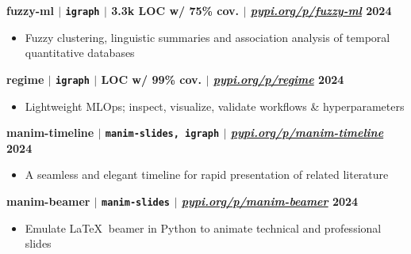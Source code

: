 \documentclass[11pt]{article} %
\begin{document}
\vspace{-4pt}

\noindent\textbf{fuzzy-ml\textsuperscript{\dag} $|$ \texttt{igraph} $|$ {\normalfont3.3k LOC w/ 75\% cov.} $|$ \href{https://pypi.org/p/fuzzy-ml}
{\normalfont\textit{pypi.org/p/fuzzy-ml}} \hfill 2024}
\vspace{-6pt}
\begin{itemize}
\setlength\itemsep{-0.5em}
  \item Fuzzy clustering, linguistic summaries and association analysis of temporal quantitative databases
\end{itemize}

\vspace{-4pt}

\noindent\textbf{regime\textsuperscript{\dag} $|$ \texttt{igraph} $|$ { LOC w/ 99\% cov.} $|$ \href{https://pypi.org/p/regime}
{\normalfont\textit{pypi.org/p/regime}} \hfill 2024}
\vspace{-6pt}
\begin{itemize}
\setlength\itemsep{-0.5em}
  \item Lightweight MLOps; inspect, visualize, validate workflows \& hyperparameters
\end{itemize}

\vspace{-4pt}

\noindent\textbf{manim-timeline\textsuperscript{\dag} $|$ \texttt{manim-slides, igraph} $|$ \href{https://pypi.org/p/manim-timeline}
{\normalfont\textit{pypi.org/p/manim-timeline}} \hfill 2024}
\vspace{-6pt}
\begin{itemize}
\setlength\itemsep{-0.5em}
  \item A seamless and elegant timeline for rapid presentation of related literature
\end{itemize}

\vspace{-4pt}

\noindent\textbf{manim-beamer\textsuperscript{\dag} $|$ \texttt{manim-slides} $|$ \href{https://pypi.org/p/manim-beamer}
{\normalfont\textit{pypi.org/p/manim-beamer}} \hfill 2024}
\vspace{-6pt}
\begin{itemize}
\setlength\itemsep{-0.5em}
  \item Emulate \LaTeX $\:$ beamer in Python to animate technical and professional slides
\end{itemize}
\end{document}
